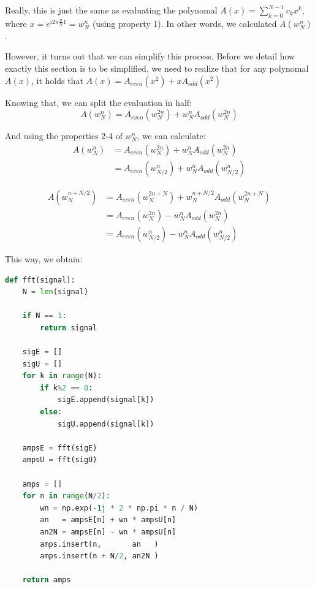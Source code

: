 Really, this is just the same as evaluating the polynomal $A(x) = \sum_{k=0}^{N-1} v_k x^k$, where $x = e^{i 2 \pi \frac{n}{N} 1} = w_N^n$ (using property 1). In other words, we calculated $A(w_N^n)$.

However, it turns out that we can simplify this process. Before we detail how exactly this section is to be simplified, we need to realize that for any polynomal $A(x)$, it holds that $A(x) = A_{even}(x^2) + x A_{odd}(x^2)$


Knowing that, we can split the evaluation in half:
$$ A(w_N^n) = A_{even}(w_N^{2n}) + w_N^n A_{odd}(w_N^{2n})$$


And using the properties 2-4 of $w_N^n$, we can calculate:
\begin{equation} 
\begin{split} 
    A(w_N^n) & = A_{even}(w_N^{2n})   + w_N^n A_{odd}(w_N^{2n})   \\
             & = A_{even}(w_{N/2}^n)  + w_N^n A_{odd}(w_{N/2}^n)
\end{split}
\end{equation}

\begin{equation} 
\begin{split}  
A(w_N^{n + N/2})  & = A_{even}(w_N^{2n+ N}) + w_N^{n+N/2} A_{odd}(w_N^{2n + N}) \\
                  & = A_{even}(w_N^{2n}) - w_N^n A_{odd}(w_N^{2n})   \\
                  & = A_{even}(w_{N/2}^n) - w_N^n A_{odd}(w_{N/2}^n)
\end{split}
\end{equation}

This way, we obtain:
\begin{lstlisting}[language=python]
def fft(signal):
    N = len(signal)

    if N == 1:
        return signal

    sigE = []
    sigU = []
    for k in range(N):
        if k%2 == 0:
            sigE.append(signal[k])
        else:
            sigU.append(signal[k])

    ampsE = fft(sigE)
    ampsU = fft(sigU)

    amps = []
    for n in range(N/2):
        wn = np.exp(-1j * 2 * np.pi * n / N)
        an   = ampsE[n] + wn * ampsU[n]
        an2N = ampsE[n] - wn * ampsU[n]
        amps.insert(n,       an   )
        amps.insert(n + N/2, an2N )

    return amps
\end{lstlisting}

